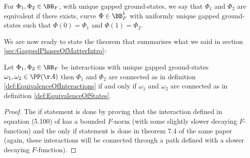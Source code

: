 \begin{definition}\label{def:EquivalenceOfInteractions}
	For $\Phi_1,\Phi_2\in\BB_F$, with unique gapped ground-states, we say that $\Phi_1$ and $\Phi_2$ are equivalent if there exists, curve $\Phi\in\BB^1_F$ with uniformly unique gapped ground-states such that $\Phi(0)=\Phi_1$ and $\Phi(1)=\Phi_2$.
\end{definition}
We are now ready to state the theorem that summarises what we said in section \ref{sec:GappedPhasesOfMatterIntro}:
\begin{theorem}\label{thrm:EquivalenceOfDefinitionsOfGappedPhasesOfMatter}
	Let $\Phi_1,\Phi_2\in\BB_F$ be interactions with unique gapped ground-states $\omega_1,\omega_2\in\PP(\AA)$ then $\Phi_1$ and $\Phi_2$ are connected as in definition \ref{def:EquivalenceOfInteractions} if and only if $\omega_1$ and $\omega_2$ are connected as in definition \ref{def:EquivalenceOfStates}.
\end{theorem}
\begin{proof}
	The if statement is done by proving that the interaction defined in equation (5.100) of \cite{nachtergaele2019quasi} has a bounded $F$-norm (with some slightly slower decaying $F$-function) and the only if statement is done in theorem 7.4 of the same paper (again, these interactions will be connected through a path defined with a slower decaying $F$-function).
\end{proof}
